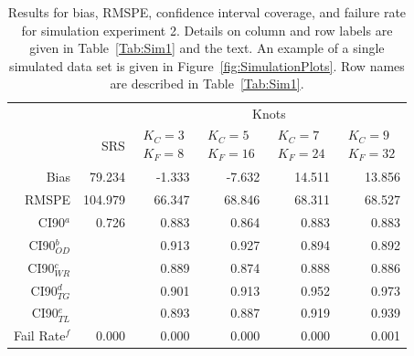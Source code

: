 \documentclass[12pt, titlepage]{article}\usepackage[]{graphicx}\usepackage[]{color}
\begin{document}
\footnotesize
\begin{table}[ht]
  \caption{Results for bias, RMSPE, confidence interval coverage, and failure rate for simulation experiment 2. Details on column and row labels are given in Table~\ref{Tab:Sim1} and the text. An example of a single simulated data set is given in Figure~\ref{fig:SimulationPlots}. Row names are described in Table~\ref{Tab:Sim1}. \label{Tab:Sim2}}
\begin{center}
\begin{tabular}{rrrrrr}
  \hline
  \hline
	&  & \multicolumn{4}{c}{Knots} \\ 
 & SRS & $\begin{array}{c}K_C=3  \\ K_F=8 \end{array}$ & $\begin{array}{c}K_C=5  \\ K_F=16 \end{array}$ & $\begin{array}{c}K_C=7  \\ K_F=24 \end{array}$ & $\begin{array}{c}K_C=9  \\ K_F=32 \end{array}$ \\
  \hline
 Bias & 79.234 & -1.333 & -7.632 & 14.511 & 13.856 \\ 
  RMSPE & 104.979 & 66.347 & 68.846 & 68.311 & 68.527 \\ 
  CI90$^a$ & 0.726 & 0.883 & 0.864 & 0.883 & 0.883 \\ 
  CI90$_{OD}^b$ &  & 0.913 & 0.927 & 0.894 & 0.892 \\ 
  CI90$_{WR}^c$ &  & 0.889 & 0.874 & 0.888 & 0.886 \\ 
  CI90$_{TG}^d$ &  & 0.901 & 0.913 & 0.952 & 0.973 \\ 
  CI90$_{TL}^e$ &  & 0.893 & 0.887 & 0.919 & 0.939 \\ 
  Fail Rate$^f$ & 0.000 & 0.000 & 0.000 & 0.000 & 0.001 \\ 
  

   \hline
\end{tabular}
\end{center}
\end{table}

\end{document}
